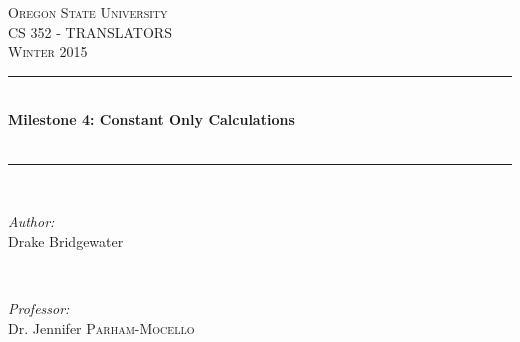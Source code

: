 \documentclass[letterpaper,10pt]{article}
\def\name{Drake Bridgewater }
\def\title{Milestone 4: Constant Only Calculations }
\def\subtitle{}
\def\subject{CS }
\def\courseNumber{352 }
\def\courseName{TRANSLATORS }
\def\courseInfo{Winter 2015 }%
\def\supervisor{Dr. Jennifer \textsc{Parham-Mocello }} %
\begin{document}
\begin{titlepage}

\newcommand{\HRule}{\rule{\linewidth}{0.5mm}} %

\center %
 

\textsc{\LARGE Oregon State University}\\[1.5cm] %
\textsc{\Large \subject \courseNumber - \courseName}\\[0.5cm] %
\textsc{\large \courseInfo}\\[1.5cm] %


\HRule \\[0.4cm]
{ \huge \bfseries \title }\\[0.1cm] %
{\small \textit{\textbf{ \subtitle }}}\\[0.2cm]
\HRule \\[7.5cm]
 

\begin{minipage}{0.4\textwidth}
\begin{flushleft} \large
\emph{Author:}\\
\name
\end{flushleft}
\end{minipage}
~
\begin{minipage}{0.4\textwidth}
\begin{flushright} \large
\emph{Professor:} \\
\supervisor
\end{flushright}
\end{minipage}\\[4cm]



\end{titlepage}
\end{document}
